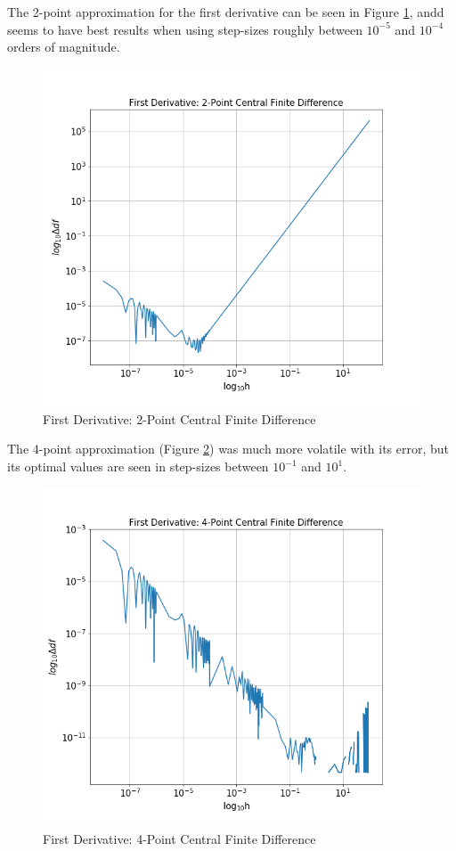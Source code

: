 \documentclass[twocolumn]{article}
\begin{document}
The 2-point approximation for the first derivative can be seen in Figure \ref{fig:df2p}, andd seems to have best results when using step-sizes 
roughly between $10^{-5}$ and $10^{-4}$ orders of magnitude.
\begin{figure}[h!]
  \centering
  \includegraphics[scale = 0.4]{df2p}
  \caption{First Derivative: 2-Point Central Finite Difference}
  \label{fig:df2p}
\end{figure}
\vfill\eject
The 4-point approximation (Figure \ref{fig:df4p}) was much more volatile with its error, but its optimal values are seen in step-sizes between $10^{-1}$ and $10^{1}$.
\begin{figure}[h]
  \centering
  \includegraphics[scale = 0.4]{df4p}
  \caption{First Derivative: 4-Point Central Finite Difference}
  \label{fig:df4p}
\end{figure}
\end{document}
